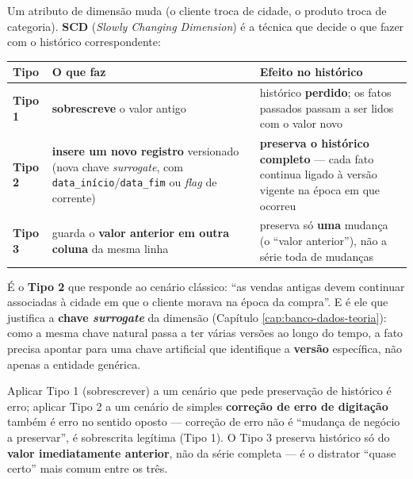 \begin{conceito}
Um atributo de dimensão muda (o cliente troca de cidade, o produto troca
de categoria). \textbf{SCD} (\textit{Slowly Changing Dimension}) é a
técnica que decide o que fazer com o histórico correspondente:

\begin{center}
\begin{tabular}{@{}p{1.9cm}p{4cm}p{5.2cm}@{}}
\toprule
\textbf{Tipo} & \textbf{O que faz} & \textbf{Efeito no histórico} \\
\midrule
\textbf{Tipo 1} & \textbf{sobrescreve} o valor antigo & histórico
\textbf{perdido}; os fatos passados passam a ser lidos com o valor novo \\
\textbf{Tipo 2} & \textbf{insere um novo registro} versionado (nova chave
\textit{surrogate}, com \texttt{data\_início}/\texttt{data\_fim} ou
\textit{flag} de corrente) & \textbf{preserva o histórico completo} ---
cada fato continua ligado à versão vigente na época em que ocorreu \\
\textbf{Tipo 3} & guarda o \textbf{valor anterior em outra coluna} da
mesma linha & preserva só \textbf{uma} mudança (o “valor anterior”), não a
série toda de mudanças \\
\bottomrule
\end{tabular}
\end{center}

É o \textbf{Tipo 2} que responde ao cenário clássico: “as vendas antigas
devem continuar associadas à cidade em que o cliente morava na época da
compra”. E é ele que justifica a \textbf{chave \textit{surrogate}} da
dimensão (Capítulo \ref{cap:banco-dados-teoria}): como a mesma chave
natural passa a ter várias versões ao longo do tempo, a fato precisa
apontar para uma chave artificial que identifique a \textbf{versão}
específica, não apenas a entidade genérica.
\end{conceito}

\begin{cuidado}
Aplicar Tipo 1 (sobrescrever) a um cenário que pede preservação de
histórico é erro; aplicar Tipo 2 a um cenário de simples \textbf{correção
de erro de digitação} também é erro no sentido oposto --- correção de erro
não é “mudança de negócio a preservar”, é sobrescrita legítima (Tipo 1).
O Tipo 3 preserva histórico só do \textbf{valor imediatamente anterior},
não da série completa --- é o distrator “quase certo” mais comum entre os
três.
\end{cuidado}

